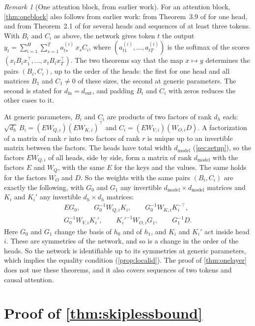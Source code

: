 \documentclass[10pt]{article}
\theoremstyle{definition}
\theoremstyle{remark}
\newtheorem{remark}[theorem]{Remark}
\newcommand{\dm}{d_{\mathrm{model}}}
\begin{document}
\begin{remark}[One attention block, from earlier work]\label{rem:oneattn}
For an attention block, \cref{thm:oneblock} also follows from earlier work: from Theorem~3.9 of \citet{henry2025lightning} for one head, and from Theorem~2.1 of \citet{henry2026generic} for several heads and sequences of at least three tokens. With $B_i$ and $C_i$ as above, the network gives token $t$ the output $y_t = \sum_{i=1}^{H}\sum_{s=1}^{T} a^{(i)}_{ts}\,x_sC_i$, where $(a^{(i)}_{t1}, \dots, a^{(i)}_{tT})$ is the softmax of the scores $(x_tB_ix_1^\top, \dots, x_tB_ix_T^\top)$. The two theorems say that the map $x \mapsto y$ determines the pairs $(B_i, C_i)$, up to the order of the heads: the first for one head and all matrices $B_1$ and $C_1 \neq 0$ of these sizes, the second at generic parameters. The second is stated for $d_{\mathrm{in}} = d_{\mathrm{out}}$, and padding $B_i$ and $C_i$ with zeros reduces the other cases to it.

At generic parameters, $B_i$ and $C_i$ are products of two factors of rank $d_h$ each: $\sqrt{d_h}\,B_i = (EW_{Q,i})(EW_{K,i})^\top$ and $C_i = (EW_{V,i})(W_{O,i}D)$. A factorization of a matrix of rank $r$ into two factors of rank $r$ is unique up to an invertible matrix between the factors. The heads have total width $\dm$ (\cref{sec:setup}), so the factors $EW_{Q,i}$ of all heads, side by side, form a matrix of rank $\dm$ with the factors $E$ and $W_Q$, with the same $E$ for the keys and the values. The same holds for the factors $W_O$ and $D$. So the weights with the same pairs $(B_i, C_i)$ are exactly the following, with $G_0$ and $G_1$ any invertible $\dm\times\dm$ matrices and $K_i$ and $K_i'$ any invertible $d_h\times d_h$ matrices:
\begin{gather*}
EG_0, \qquad G_0^{-1}W_{Q,i}K_i, \qquad G_0^{-1}W_{K,i}K_i^{-\top}, \\
G_0^{-1}W_{V,i}K_i', \qquad K_i'^{-1}W_{O,i}G_1, \qquad G_1^{-1}D.
\end{gather*}
Here $G_0$ and $G_1$ change the basis of $h_0$ and of $h_1$, and $K_i$ and $K_i'$ act inside head $i$. These are symmetries of the network, and so is a change in the order of the heads. So the network is identifiable up to its symmetries at generic parameters, which implies the equality condition (\cref{prop:localid}). The proof of \cref{thm:onelayer} does not use these theorems, and it also covers sequences of two tokens and causal attention.
\end{remark}

\section{Proof of \texorpdfstring{\cref{thm:skiplessbound}}{the theorem at any depth}}\label{app:skiplessbound}\label{app:rmsskipless}\label{app:epszeroskipless}
\end{document}
